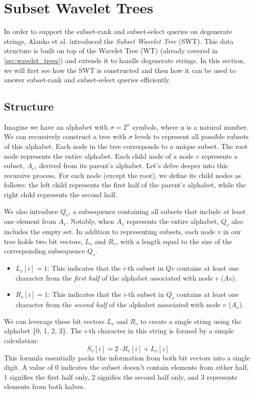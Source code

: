 \section{Subset Wavelet Trees} \label{sec:subset_wavelet_trees}
In order to support the subset-rank and subset-select queries on degenerate strings, Alanko et al. \cite{SubsetWT} introduced the \emph{Subset Wavelet Tree} (SWT). This data structure is built on top of the Wavelet Tree (WT) \cite{GrossiWT2003} (already covered in \autoref{sec:wavelet_trees}) and extends it to handle degenerate strings. In this section, we will first see how the SWT is constructed and then how it can be used to answer subset-rank and subset-select queries efficiently.

\subsection{Structure} \label{sec:swt_structure}

Imagine we have an alphabet with $\sigma = 2^n$ symbols, where n is a natural number. We can recursively construct a tree with $\sigma$ levels to represent all possible subsets of this alphabet. Each node in the tree corresponds to a unique subset. The root node represents the entire alphabet. Each child node of a node $v$ represents a subset, $A_v$, derived from its parent's alphabet. Let's delve deeper into this recursive process. For each node (except the root), we define its child nodes as follows: the left child represents the first half of the parent's alphabet, while the right child represents the second half. \vspace{0.4cm}

\noindent We also introduce $Q_v$, a subsequence containing all subsets that include at least one element from $A_v$. Notably, when $A_v$ represents the entire alphabet, $Q_v$ also includes the empty set. In addition to representing subsets, each node $v$ in our tree holds two bit vectors, $L_v$ and $R_v$, with a length equal to the size of the corresponding subsequence $Q_v$.
\begin{itemize}
    \item $L_v[i] = 1$: This indicates that the $i$-th subset in $Qv$ contains at least one character from the \emph{first half} of the alphabet associated with node $v$ ($Av$).
    \item $R_v[i] = 1$: This indicates that the $i$-th subset in $Q_v$ contains at least one character from the \emph{second half} of the alphabet associated with node $v$ ($A_v$).
\end{itemize}
We can leverage these bit vectors $L_v$ and $R_v$ to create a single string using the alphabet \{0, 1, 2, 3\}. The $i$-th character in this string is formed by a simple calculation:
\begin{equation}
    S_v[i] = 2 \cdot R_v[i] + L_v[i]
\end{equation}
This formula essentially packs the information from both bit vectors into a single digit. A value of $0$ indicates the subset doesn't contain elements from either half, $1$ signifies the first half only, $2$ signifies the second half only, and $3$ represents elements from both halves. \vspace{0.4cm}

